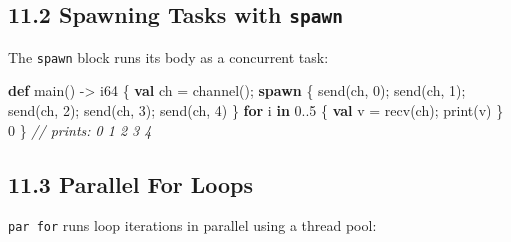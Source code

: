 \documentclass[
  english,
]{book}
\newenvironment{Shaded}{\begin{snugshade}}{\end{snugshade}}
\newcommand{\CommentTok}[1]{\textcolor[rgb]{0.42,0.60,0.33}{\textit{#1}}}
\newcommand{\ControlFlowTok}[1]{\textcolor[rgb]{0.77,0.53,0.75}{\textbf{#1}}}
\newcommand{\DataTypeTok}[1]{\textcolor[rgb]{0.31,0.79,0.69}{#1}}
\newcommand{\DecValTok}[1]{\textcolor[rgb]{0.71,0.81,0.66}{#1}}
\newcommand{\FunctionTok}[1]{\textcolor[rgb]{0.86,0.86,0.67}{#1}}
\newcommand{\KeywordTok}[1]{\textcolor[rgb]{0.34,0.61,0.84}{\textbf{#1}}}
\newcommand{\NormalTok}[1]{\textcolor[rgb]{0.83,0.83,0.83}{#1}}
\newcommand{\OperatorTok}[1]{\textcolor[rgb]{0.83,0.83,0.83}{#1}}
\begin{document}
\subsection{\texorpdfstring{11.2 Spawning Tasks with
\texttt{spawn}}{11.2 Spawning Tasks with spawn}}\label{spawning-tasks-with-spawn}

The \texttt{spawn} block runs its body as a concurrent task:

\begin{Shaded}
\begin{Highlighting}[]
\KeywordTok{def}\NormalTok{ main() }\OperatorTok{{-}\textgreater{}} \DataTypeTok{i64}\NormalTok{ \{}
    \KeywordTok{val}\NormalTok{ ch }\OperatorTok{=} \FunctionTok{channel}\NormalTok{();}
    \KeywordTok{spawn}\NormalTok{ \{}
        \FunctionTok{send}\NormalTok{(ch, }\DecValTok{0}\NormalTok{);}
        \FunctionTok{send}\NormalTok{(ch, }\DecValTok{1}\NormalTok{);}
        \FunctionTok{send}\NormalTok{(ch, }\DecValTok{2}\NormalTok{);}
        \FunctionTok{send}\NormalTok{(ch, }\DecValTok{3}\NormalTok{);}
        \FunctionTok{send}\NormalTok{(ch, }\DecValTok{4}\NormalTok{)}
\NormalTok{    \}}
    \ControlFlowTok{for}\NormalTok{ i }\ControlFlowTok{in} \DecValTok{0}\OperatorTok{..}\DecValTok{5}\NormalTok{ \{}
        \KeywordTok{val}\NormalTok{ v }\OperatorTok{=} \FunctionTok{recv}\NormalTok{(ch);}
        \FunctionTok{print}\NormalTok{(v)}
\NormalTok{    \}}
    \DecValTok{0}
\NormalTok{\}}
\CommentTok{// prints: 0 1 2 3 4}
\end{Highlighting}
\end{Shaded}

\subsection{11.3 Parallel For Loops}\label{parallel-for-loops}

\texttt{par\ for} runs loop iterations in parallel using a thread pool:
\end{document}
